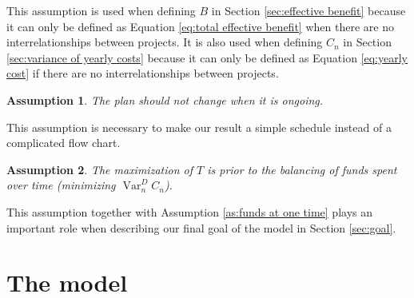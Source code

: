 \documentclass{article}
\DeclareMathOperator*{\var}{Var}
\newtheorem{assumption}{Assumption}
\begin{document}
This assumption is used when defining $B$ in Section \ref{sec:effective benefit} because it can only be defined as Equation \ref{eq:total effective benefit} when there are no interrelationships between projects.
It is also used when defining $C_n$ in Section \ref{sec:variance of yearly costs} because it can only be defined as Equation \ref{eq:yearly cost} if there are no interrelationships between projects.

\begin{assumption}
The plan should not change when it is ongoing.
\end{assumption}

This assumption is necessary to make our result a simple schedule instead of a complicated flow chart.

\begin{assumption}
\label{as:time efficiency over balancing}
The maximization of $T$ is prior to the balancing of funds spent over time (minimizing $\var_n^DC_n$).
\end{assumption}

This assumption together with Assumption \ref{as:funds at one time} plays an important role when describing our final goal of the model in Section \ref{sec:goal}.

\section{The model}
\label{sec:model}
\end{document}
